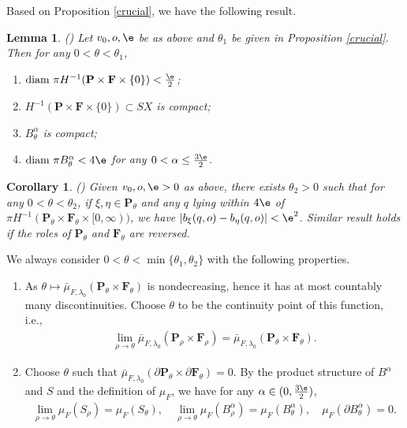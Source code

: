 \documentclass[11pt]{amsart}
\newtheorem{corollary}[theorem]{Corollary}
\newtheorem{lemma}[theorem]{Lemma}
\theoremstyle{definition}
\def\a{\alpha}
\def\l{\lambda}   \def\L{\Lambda}
\def\bP{\textbf{P}}
\def\bF{\textbf{F}}
\begin{document}
Based on Proposition \ref{crucial}, we have the following result.


\begin{lemma}\label{diameter}(\cite[Lemma 2.13]{Wu2})
Let $v_0, o, \e$ be as above and $\theta_1$ be given in Proposition \ref{crucial}. Then for any $0<\theta<\theta_1$,
\begin{enumerate}
  \item $\text{diam\ } \pi H^{-1}(\bP\times \bF\times \{0\})<\frac{\e}{2}$;
  \item $H^{-1}(\bP\times \bF\times \{0\})\subset SX$ is compact;
  \item $B_\theta^\a$ is compact;
  \item $\text{diam\ } \pi B_\theta^\a <4\e$ for any $0<\a\le \frac{3\e}{2}$.
\end{enumerate}
\end{lemma}

\begin{corollary}\label{equicon}(\cite[Lemma 2.14]{Wu2})
Given $v_0, o, \e>0$ as above, there exists $\theta_2>0$ such that for any $0<\theta<\theta_2$, if $\xi,\eta\in \bP_\theta$ and any $q$ lying within $4\e$ of $\pi H^{-1}(\bP_\theta\times \bF_\theta\times [0,\infty))$, we have $|b_\xi(q,o)-b_\eta(q,o)|<\e^2$. Similar result holds if the roles of $\bP_\theta$ and $\bF_\theta$ are reversed.
\end{corollary}

We always consider $0<\theta< \min\{\theta_1,\theta_2\}$ with the following properties. 
\begin{enumerate}
    \item As $\theta\mapsto \bar\mu_{F,\l_0}(\bP_\theta\times \bF_\theta)$ is nondecreasing, hence it has at most countably many discontinuities. Choose $\theta$ to be the continuity point of this function, i.e., 
    \begin{equation}\label{e:choice0}
\begin{aligned}
\lim_{\rho\to \theta}\bar\mu_{F,\l_0}(\bP_\rho\times \bF_\rho)=\bar\mu_{F,\l_0}(\bP_\theta\times \bF_\theta).
\end{aligned}
\end{equation}
\item Choose $\theta$ such that $\bar\mu_{F,\l_0}(\partial\bP_\theta\times \partial\bF_\theta)=0.$ By the product structure of $B^\a$ and $S$ and the definition of $\mu_F$, we have for any $\a\in (0,\frac{3\e}{2})$,
\begin{equation}\label{e:choice}
\begin{aligned}
\lim_{\rho\to \theta} \mu_F(S_\rho)=\mu_F(S_\theta), \quad \lim_{\rho\to \theta} \mu_F(B^\a_\rho)=\mu_F(B^\a_\theta), \quad \mu_F(\partial B^\a_\theta)=0.
\end{aligned}
\end{equation}
\end{enumerate}
\end{document}
